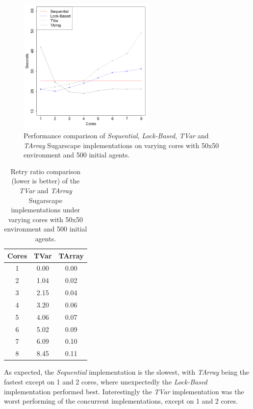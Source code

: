 \begin{figure}
	\centering
	\includegraphics[width=0.6\textwidth, angle=0]{./fig/concurrentabs/sugarscape/sugarscape_varyingcores_constagents.png}
	\caption{Performance comparison of \textit{Sequential}, \textit{Lock-Based}, \textit{TVar} and \textit{TArray} Sugarscape implementations on varying cores with 50x50 environment and 500 initial agents.}
	\label{fig:sugarscape_varyingcores_constagents}
\end{figure}

\begin{table}
	\centering
  	\begin{tabular}{ c || c | c }
        Cores & TVar  & TArray  \\ \hline \hline 
    		1     & 0.00  & 0.00    \\ \hline
   		2     & 1.04  & 0.02    \\ \hline
   		3     & 2.15  & 0.04    \\ \hline
   		4     & 3.20  & 0.06    \\ \hline
   		5     & 4.06  & 0.07    \\ \hline
   		6     & 5.02  & 0.09    \\ \hline
   		7     & 6.09  & 0.10    \\ \hline
   		8     & 8.45  & 0.11    \\ \hline \hline
   	\end{tabular}
 
  	\caption{Retry ratio comparison (lower is better) of the \textit{TVar} and \textit{TArray} Sugarscape implementations under varying cores with 50x50 environment and 500 initial agents.}
	\label{tab:sugarscape_retry_ratios}
\end{table}

As expected, the \textit{Sequential} implementation is the slowest, with \textit{TArray} being the fastest except on 1 and 2 cores, where unexpectedly the \textit{Lock-Based} implementation performed best. Interestingly the \textit{TVar} implementation was the worst performing of the concurrent implementations, except on 1 and 2 cores.


